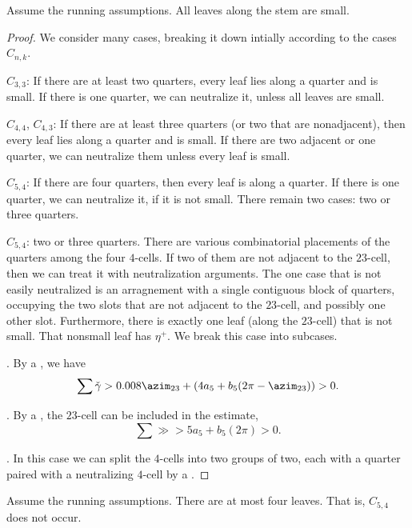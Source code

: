 \begin{lemma}
Assume the running assumptions.   All leaves along the stem are small.
\end{lemma}

\begin{proof} We consider many cases, breaking it down intially according to the cases $C_{n,k}$.

$C_{3,3}$:  If there are at least two quarters, every leaf lies along a quarter and is small.
If there is one quarter, we can neutralize it, unless all leaves are small.

$C_{4,4}$, $C_{4,3}$: If there are at least three quarters (or two that are nonadjacent), then every leaf lies along a quarter
and is small.  If there are two adjacent or one quarter, we can neutralize them unless every leaf is small.

$C_{5,4}$: If there are four quarters, then every leaf is along a quarter.
If there is one quarter, we can neutralize it, if it is not small.
There remain two cases: two or three quarters.

$C_{5,4}$: two or three quarters.  There are various combinatorial placements of the quarters among the four $4$-cells.  If two of them are not adjacent to the $23$-cell, then we can treat it with neutralization arguments.  The one case that is not easily neutralized is an arragnement with a single contiguous block of quarters, occupying the two slots that are not adjacent to the $23$-cell, and possibly one other slot.  Furthermore, there is exactly one leaf (along the $23$-cell) that is not small.   That nonsmall leaf has $\eta^+$.  We break this case into subcases.

.  By a , we have
\[
\sum \gg > 0.008 \azim_{23} + (4 a_5 + b_5 (2\pi-\azim_{23})) > 0.
\]

.
By a , the $23$-cell can be included in the estimate,
\[
\sum \gg > 5 a_5 + b_5 (2\pi) > 0.
\]

.
In this case we can split the $4$-cells into two groups of two, each with
a quarter paired with a neutralizing $4$-cell by a .
\end{proof}

\begin{lemma}
Assume the running assumptions.   There are at most four leaves.  That is, $C_{5,4}$ does not occur.
\end{lemma}

